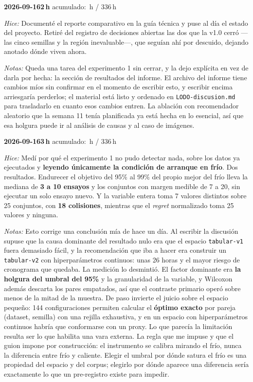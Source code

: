 \documentclass[11pt,letterpaper]{article}
\newcommand{\presupuesto}{336}
\newcommand{\horasacum}{0}
\newcommand{\entrada}[4]{%
  \xdef\horasacum{\fpeval{\horasacum + #2}}%
  \par\medskip
  \noindent\textbf{\color{tecnavy}#1}\quad\textbf{#2\,h}%
  \hfill{\small\color{gris}acumulado: \horasacum\,h / \presupuesto\,h}\par
  \nopagebreak
  \noindent\textit{Hice:} #3\par
  \nopagebreak
  \noindent\textit{Notas:} #4\par
}
\begin{document}
\entrada{2026-09-16}{2}
{Documenté el reporte comparativo en la guía técnica y puse al día el estado del proyecto.
 Retiré del registro de decisiones abiertas las dos que la v1.0 cerró —las cinco semillas y
 la región inevaluable—, que seguían ahí por descuido, dejando anotado dónde viven ahora.}
{Queda una tarea del experimento 1 sin cerrar, y la dejo explícita en vez de darla por
 hecha: la sección de resultados del informe. El archivo del informe tiene cambios míos sin
 confirmar en el momento de escribir esto, y escribir encima arriesgaría perderlos; el
 material está listo y ordenado en \texttt{LODO-discusion.md} para trasladarlo en cuanto
 esos cambios entren. La ablación con recomendador aleatorio que la semana 11 tenía
 planificada ya está hecha en lo esencial, así que esa holgura puede ir al análisis de
 causas y al caso de imágenes.}

\entrada{2026-09-16}{3}
{Medí por qué el experimento 1 no pudo detectar nada, sobre los datos ya ejecutados y
 \textbf{leyendo únicamente la condición de arranque en frío}. Dos resultados. Endurecer el
 objetivo del 95\% al 99\% del propio mejor del frío lleva la mediana de \textbf{3 a 10
 ensayos} y los conjuntos con margen medible de 7 a 20, sin ejecutar un solo ensayo nuevo.
 Y la variable entera toma 7 valores distintos sobre 25 conjuntos, con \textbf{18
 colisiones}, mientras que el \emph{regret} normalizado toma 25 valores y ninguna.}
{Esto corrige una conclusión mía de hace un día. Al escribir la discusión supuse que la
 causa dominante del resultado nulo era que el espacio \texttt{tabular-v1} fuera demasiado
 fácil, y la recomendación que iba a hacer era construir un \texttt{tabular-v2} con
 hiperparámetros continuos: unas 26 horas y el mayor riesgo de cronograma que quedaba. La
 medición lo desmintió. El factor dominante era \textbf{la holgura del umbral del 95\%} y la
 granularidad de la variable, y Wilcoxon además descarta los pares empatados, así que el
 contraste primario operó sobre menos de la mitad de la muestra. De paso invierte el juicio
 sobre el espacio pequeño: 144 configuraciones permiten calcular el \textbf{óptimo exacto}
 por pareja (dataset, semilla) con una rejilla exhaustiva, y en un espacio con
 hiperparámetros continuos habría que conformarse con un proxy. Lo que parecía la limitación
 resulta ser lo que habilita una vara externa. La regla que me impuse y que el guion
 impone por construcción: el instrumento se calibra mirando el frío, nunca la diferencia
 entre frío y caliente. Elegir el umbral por dónde satura el frío es una propiedad del
 espacio y del corpus; elegirlo por dónde aparece una diferencia sería exactamente lo que un
 pre-registro existe para impedir.}
\end{document}
